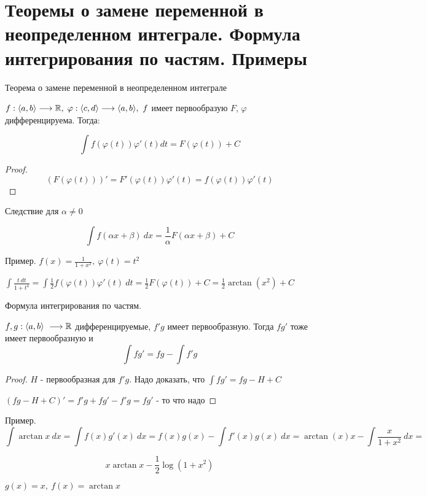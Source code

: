 \section{Теоремы о замене переменной в неопределенном интеграле. Формула интегрирования по частям. Примеры \href{https://youtu.be/p9C57KDo1Yg?t=5408}{\Walley}}

\begin{theorem-non}
    Теорема о замене переменной в неопределенном интеграле

    $f: \langle a, b \rangle \longrightarrow \mathbb{R}, \; \varphi: \langle c, d \rangle \longrightarrow \langle a, b \rangle,\ f$
    имеет первообразую $F$, $\varphi$ дифференцируема. Тогда:

    \[ \int f(\varphi(t))\varphi'(t) dt = F(\varphi(t))+C \]
\end{theorem-non}

\begin{proof}
    \[(F(\varphi(t)))' = F'(\varphi(t))\varphi'(t) = f(\varphi(t))\varphi'(t)\]
\end{proof}

Следствие для $\alpha \neq 0$

\[\int f(\alpha x + \beta)\ dx = \frac{1}{\alpha} F(\alpha x + \beta) + C \]

Пример. $f(x) = \frac{1}{1+x^2},\ \varphi(t) = t^2$

$\int \frac{t\ dt}{1+t^4} = \int \frac{1}{2}f(\varphi(t))\varphi'(t)\ dt
= \frac{1}{2} F(\varphi(t)) + C = \frac{1}{2} \arctan(x^2) + C$

\begin{theorem-non}
    Формула интегрирования по частям.

    $f, g: \langle a, b \rangle \ \longrightarrow \R$ дифференцируемые, $f'g$ имеет первообразную. Тогда
    $fg'$ тоже имеет первообразную и 
    \[ \int fg' = fg - \int f'g \]
\end{theorem-non}

\begin{proof}
    $H$ - первообразная для $f'g$. Надо доказать, что $\int fg' = fg - H + C$
    
    $(fg - H +C)' = f'g+fg'-f'g = fg'$ - то что надо
\end{proof}

Пример. \[\int \arctan x\ dx = \int f(x)g'(x)\ dx =
f(x)g(x)-\int f'(x)g(x)\ dx = \arctan(x)x - \int \frac{x}{1+x^2}\ dx = \]

\[ x\arctan x - \frac{1}{2} \log(1+x^2)\]

$g(x) = x,\ f(x) = \arctan x$